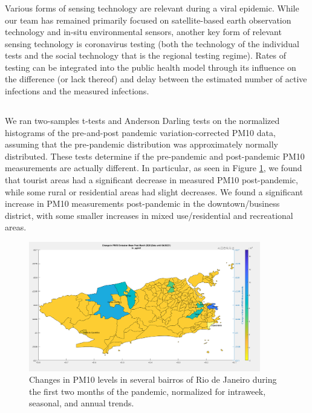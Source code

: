 \subsubsection{}

Various forms of sensing technology are relevant during a viral epidemic. While our team has remained primarily focused on satellite-based earth observation technology and in-situ environmental sensors, another key form of relevant sensing technology is coronavirus testing (both the technology of the individual tests and the social technology that is the regional testing regime). Rates of testing can be integrated into the public health model through its influence on the difference (or lack thereof) and delay between the estimated number of active infections and the measured infections.

\subsection{} \label{sec:vida-evdt-result}

\subsubsection{} \label{sec:vida-evdt-e-result}

We ran two-samples t-tests and Anderson Darling tests on the normalized histograms of the pre-and-post pandemic variation-corrected PM10 data, assuming that the pre-pandemic distribution was approximately normally distributed. These tests determine if the pre-pandemic and post-pandemic PM10 measurements are actually different. In particular, as seen in Figure \ref{fig:pm}, we found that tourist areas had a significant decrease in measured PM10 post-pandemic, while some rural or residential areas had slight decreases. We found a significant increase in PM10 measurements post-pandemic in the downtown/business district, with some smaller increases in mixed use/residential and recreational areas. 

\begin{figure}[h]
\centering
\includegraphics[width=0.9\textwidth]{Figures/chap5/pm10.png}
\caption[Changes in PM10 in Rio de Janeiro]{Changes in PM10 levels in several bairros of Rio de Janeiro during the first two months of the pandemic, normalized for intraweek, seasonal, and annual trends.}
\label{fig:pm}
\end{figure}

